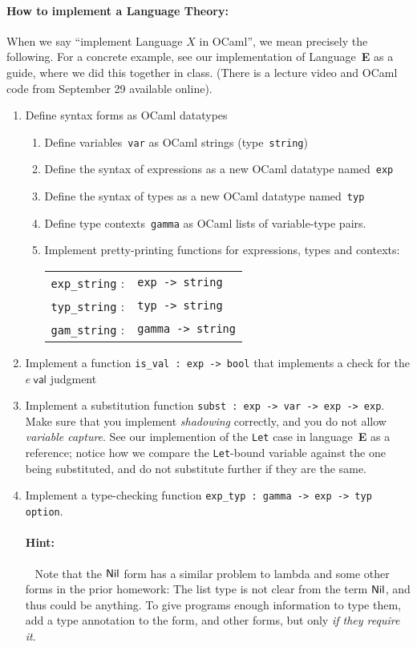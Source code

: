 \documentclass[11pt]{article}
\newcommand{\E}{\textbf{\textsf{E}}\xspace}
\begin{document}
\paragraph{How to implement a Language Theory:}
When we say ``implement Language $X$ in OCaml'', we mean precisely the
following.  For a concrete example, see our implementation of
Language~\E as a guide, where we did this together in class.  (There
is a lecture video and OCaml code from September 29 available online).
\begin{enumerate}
\item Define syntax forms as OCaml datatypes 
\begin{enumerate}
\item Define variables~\texttt{var} as OCaml strings (type~\texttt{string})
\item Define the syntax of expressions as a new OCaml datatype named~\texttt{exp}
\item Define the syntax of types as a new OCaml datatype named~\texttt{typ}
\item Define type contexts~\texttt{gamma} as OCaml lists of variable-type pairs.
\item Implement pretty-printing functions for expressions, types and contexts:\\ 
\begin{tabular}{ll}
\texttt{exp\_string} :& \texttt{exp -> string}
\\
\texttt{typ\_string} :& \texttt{typ -> string}
\\
\texttt{gam\_string} :& \texttt{gamma -> string}
\end{tabular}
\end{enumerate}
\item Implement a function \texttt{is\_val : exp -> bool} that implements a check for the $e~\textsf{val}$ judgment
\item Implement a substitution function \texttt{subst : exp -> var -> exp -> exp}.  
{
Make sure that you implement \emph{shadowing} correctly, and you do
not allow \emph{variable capture}.  
%
See our implemention of the \texttt{Let} case in language~\E
as a reference; notice how we compare the \texttt{Let}-bound variable
against the one being substituted, and do not substitute further if
they are the same.  }
\item Implement a type-checking function \texttt{exp\_typ : gamma ->
  exp -> typ option}.  

  \paragraph{Hint:}~
  Note that the $\textsf{Nil}$ form has a similar problem to lambda and some
  other forms in the prior homework: The list type is not clear from
  the term $\textsf{Nil}$, and thus could be anything.
  To give programs enough information to type them, add a type
  annotation to the \Nil form, and other forms, but only \emph{if they
    require it}. 


\end{enumerate}
\end{document}
